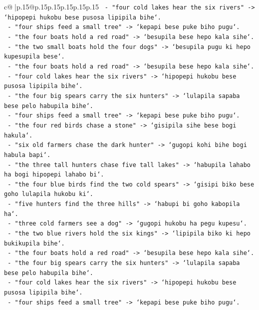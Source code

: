 \documentclass{article}
\begin{document}
{\begin{supertabular}{c@{$\;$}|p{.15\linewidth}@{}p{.15\linewidth}p{.15\linewidth}p{.15\linewidth}p{.15\linewidth}p{.15\linewidth}}
{{{\texttt{  {-} "four cold lakes hear the six rivers" {-}> `hipopepi hukobu bese pusosa lipipila bihe`.} \\
\texttt{  {-} "four ships feed a small tree" {-}> `kepapi bese puke biho pugu`.} \\
\texttt{  {-} "the four boats hold a red road" {-}> `besupila bese hepo kala sihe`.} \\
\texttt{  {-} "the two small boats hold the four dogs" {-}> `besupila pugu ki hepo kupesupila bese`.} \\
\texttt{  {-} "the four boats hold a red road" {-}> `besupila bese hepo kala sihe`.} \\
\texttt{  {-} "four cold lakes hear the six rivers" {-}> `hipopepi hukobu bese pusosa lipipila bihe`.} \\
\texttt{  {-} "the four big spears carry the six hunters" {-}> `lulapila sapaba bese pelo habupila bihe`.} \\
\texttt{  {-} "four ships feed a small tree" {-}> `kepapi bese puke biho pugu`.} \\
\texttt{  {-} "the four red birds chase a stone" {-}> `gisipila sihe bese bogi hakula`.} \\
\texttt{  {-} "six old farmers chase the dark hunter" {-}> `gugopi kohi bihe bogi habula bapi`.} \\
\texttt{  {-} "the three tall hunters chase five tall lakes" {-}> `habupila lahabo ha bogi hipopepi lahabo bi`.} \\
\texttt{  {-} "the four blue birds find the two cold spears" {-}> `gisipi biko bese goho lulapila hukobu ki`.} \\
\texttt{  {-} "five hunters find the three hills" {-}> `habupi bi goho kabopila ha`.} \\
\texttt{  {-} "three cold farmers see a dog" {-}> `gugopi hukobu ha pegu kupesu`.} \\
\texttt{  {-} "the two blue rivers hold the six kings" {-}> `lipipila biko ki hepo bukikupila bihe`.} \\
\texttt{  {-} "the four boats hold a red road" {-}> `besupila bese hepo kala sihe`.} \\
\texttt{  {-} "the four big spears carry the six hunters" {-}> `lulapila sapaba bese pelo habupila bihe`.} \\
\texttt{  {-} "four cold lakes hear the six rivers" {-}> `hipopepi hukobu bese pusosa lipipila bihe`.} \\
\texttt{  {-} "four ships feed a small tree" {-}> `kepapi bese puke biho pugu`.} \\
}}}
\end{supertabular}}
\end{document}
